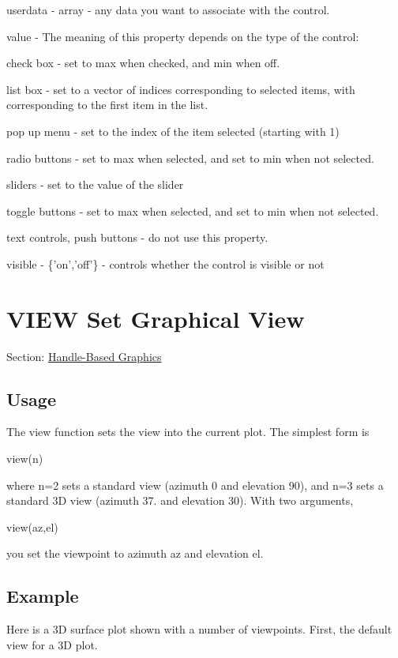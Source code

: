 \begin{DoxyItemize}
\item {\ttfamily userdata} -\/ {\ttfamily array} -\/ any data you want to associate with the control.  
\item {\ttfamily value} -\/ The meaning of this property depends on the type of the control\-: 
\begin{DoxyItemize}
\item check box -\/ set to {\ttfamily max} when checked, and {\ttfamily min} when off.  
\item list box -\/ set to a vector of indices corresponding to selected items, with {} corresponding to the first item in the list.  
\item pop up menu -\/ set to the index of the item selected (starting with 1)  
\item radio buttons -\/ set to {\ttfamily max} when selected, and set to {\ttfamily min} when not selected.  
\item sliders -\/ set to the value of the slider  
\item toggle buttons -\/ set to {\ttfamily max} when selected, and set to {\ttfamily min} when not selected.  
\item text controls, push buttons -\/ do not use this property.  
\end{DoxyItemize}
\item {\ttfamily visible} -\/ {\ttfamily \{'on','off'\}} -\/ controls whether the control is visible or not  
\end{DoxyItemize}\hypertarget{handle_view}{}\section{V\-I\-E\-W Set Graphical View}\label{handle_view}
Section\-: \hyperlink{sec_handle}{Handle-\/\-Based Graphics} \hypertarget{vtkwidgets_vtkxyplotwidget_Usage}{}\subsection{Usage}\label{vtkwidgets_vtkxyplotwidget_Usage}
The {\ttfamily view} function sets the view into the current plot. The simplest form is \begin{DoxyVerb}  view(n)
\end{DoxyVerb}
 where {\ttfamily n=2} sets a standard view (azimuth 0 and elevation 90), and {\ttfamily n=3} sets a standard 3\-D view (azimuth 37. and elevation 30). With two arguments, \begin{DoxyVerb}  view(az,el)
\end{DoxyVerb}
 you set the viewpoint to azimuth {\ttfamily az} and elevation {\ttfamily el}. \hypertarget{variables_struct_Example}{}\subsection{Example}\label{variables_struct_Example}
Here is a 3\-D surface plot shown with a number of viewpoints. First, the default view for a 3\-D plot.



